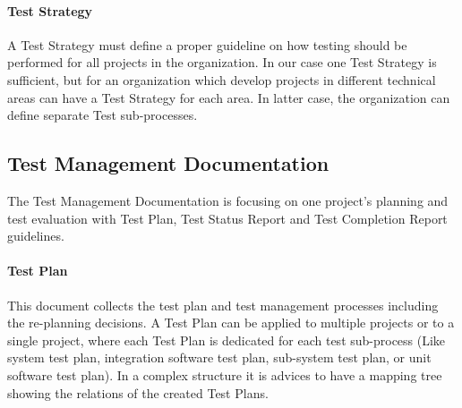 \paragraph{Test Strategy}
A Test Strategy must define a proper guideline on how testing should be performed for all projects in the organization. In our case one Test Strategy is sufficient, but for an organization which develop projects in different technical areas can have a Test Strategy for each area. In latter case, the organization can define separate Test sub-processes. 



\subsection{Test Management Documentation}
The Test Management Documentation is focusing on one project's planning and test evaluation with Test Plan, Test Status Report and Test Completion Report guidelines.

\paragraph{Test Plan}
This document collects the test plan and test management processes including the re-planning decisions. A Test Plan can be applied to multiple projects or to a single project, where each Test Plan is dedicated for each test sub-process (Like system test plan, integration software test plan, sub-system test plan, or unit software test plan). In a complex structure it is advices to have a mapping tree showing the relations of the created Test Plans.


